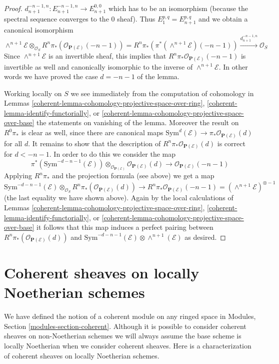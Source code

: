\begin{proof}
$d_{n + 1}^{-n - 1, n} : E_{n + 1}^{-n - 1, n} \to E_{n + 1}^{0, 0}$
which has to be an isomorphism (because the spectral sequence converges
to the $0$ sheaf). Thus $E_1^{p, q} = E_{n + 1}^{p, q}$ and
we obtain a canonical isomorphism
$$
\wedge^{n + 1}\mathcal{E} \otimes_{\mathcal{O}_S}
R^n\pi_*\left(\mathcal{O}_{\mathbf{P}(\mathcal{E})}(-n - 1)\right) =
R^n\pi_*\left(\pi^*(\wedge^{n + 1}\mathcal{E})(-n - 1)\right)
\xrightarrow{d_{n + 1}^{-n - 1, n}}
\mathcal{O}_S
$$
Since $\wedge^{n + 1}\mathcal{E}$ is an invertible
sheaf, this implies that
$R^n\pi_*\mathcal{O}_{\mathbf{P}(\mathcal{E})}(-n - 1)$ is invertible
as well and canonically isomorphic to the inverse of
$\wedge^{n + 1}\mathcal{E}$. In other words we have proved the case
$d = - n - 1$ of the lemma.

\medskip\noindent
Working locally on $S$ we see immediately from the computation of
cohomology in Lemmas \ref{coherent-lemma-cohomology-projective-space-over-ring},
\ref{coherent-lemma-identify-functorially}, or
\ref{coherent-lemma-cohomology-projective-space-over-base} the statements on
vanishing of the lemma. Moreover the result on $R^0\pi_*$ is clear
as well, since there are canonical maps
$\text{Sym}^d(\mathcal{E}) \to \pi_* \mathcal{O}_{\mathbf{P}(\mathcal{E})}(d)$
for all $d$. It remains to show that the description of
$R^n\pi_*\mathcal{O}_{\mathbf{P}(\mathcal{E})}(d)$ is correct
for $d < -n - 1$. In order to do this we consider the map
$$
\pi^*(\text{Sym}^{-d - n - 1}(\mathcal{E}))
\otimes_{\mathcal{O}_{\mathbf{P}(\mathcal{E})}}
\mathcal{O}_{\mathbf{P}(\mathcal{E})}(d)
\longrightarrow
\mathcal{O}_{\mathbf{P}(\mathcal{E})}(-n - 1)
$$
Applying $R^n\pi_*$ and the projection formula (see above) we get a map
$$
\text{Sym}^{-d - n - 1}(\mathcal{E})
\otimes_{\mathcal{O}_S}
R^n\pi_*(\mathcal{O}_{\mathbf{P}(\mathcal{E})}(d))
\longrightarrow
R^n\pi_*\mathcal{O}_{\mathbf{P}(\mathcal{E})}(-n - 1) =
(\wedge^{n + 1}\mathcal{E})^{\otimes -1}
$$
(the last equality we have shown above).
Again by the local calculations of Lemmas
\ref{coherent-lemma-cohomology-projective-space-over-ring},
\ref{coherent-lemma-identify-functorially}, or
\ref{coherent-lemma-cohomology-projective-space-over-base}
it follows that this map induces a perfect pairing between
$R^n\pi_*(\mathcal{O}_{\mathbf{P}(\mathcal{E})}(d))$ and
$\text{Sym}^{-d - n - 1}(\mathcal{E}) \otimes \wedge^{n + 1}(\mathcal{E})$
as desired.
\end{proof}

\section{Coherent sheaves on locally Noetherian schemes}
\label{coherent-section-coherent-sheaves}
We have defined the notion of a coherent module on any ringed space in
Modules, Section \ref{modules-section-coherent}.
Although it is possible to consider coherent sheaves on non-Noetherian
schemes we will always assume the base scheme is locally Noetherian when
we consider coherent sheaves. Here is a characterization of coherent
sheaves on locally Noetherian schemes.

